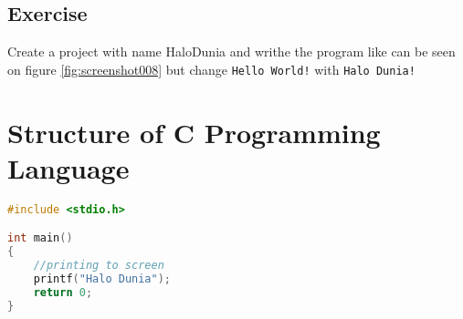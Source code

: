\subsection{Exercise}
Create a project with name HaloDunia and writhe the program like can be seen on figure \ref{fig:screenshot008} but change \verb|Hello World!| with \verb|Halo Dunia!|

%			
%			
%			
\section{Structure of C Programming Language}

\begin{lstlisting}[language=c,caption=Contoh program sederhana dalam bahasa C,label=lst:helloworld,captionpos=t]
#include <stdio.h>

int main()
{
	//printing to screen
	printf("Halo Dunia");
	return 0;
}
\end{lstlisting}

